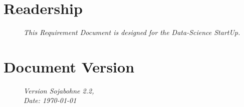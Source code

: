 
\section{Readership}

\begin{description}
  \item [] 
    \textit{
    This Requirement Document is designed for the Data-Science StartUp.
    }
\end{description}

\section{Document Version}
\begin{description}
  \item [] 
    \textit{Version Sojabohne 2.2, \\Date: \today}
\end{description}